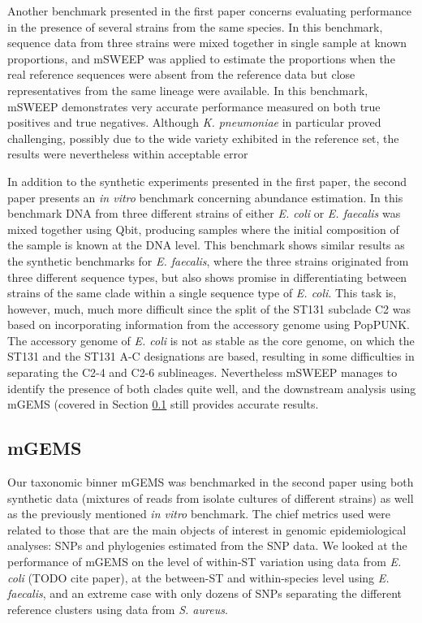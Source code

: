 \documentclass[officiallayout]{tktla}
\begin{document}
Another benchmark presented in the first paper concerns evaluating
performance in the presence of several strains from the same
species. In this benchmark, sequence data from three strains were
mixed together in single sample at known proportions, and mSWEEP was
applied to estimate the proportions when the real reference sequences
were absent from the reference data but close representatives from the
same lineage were available. In this benchmark, mSWEEP demonstrates
very accurate performance measured on both true positives and true
negatives. Although \textit{K. pneumoniae} in particular proved
challenging, possibly due to the wide variety exhibited in the
reference set, the results were nevertheless within acceptable error

In addition to the synthetic experiments presented in the first paper,
the second paper presents an \textit{in vitro} benchmark concerning
abundance estimation. In this benchmark DNA from three different
strains of either \textit{E. coli} or \textit{E. faecalis} was mixed
together using Qbit, producing samples where the initial composition
of the sample is known at the DNA level. This benchmark shows similar
results as the synthetic benchmarks for \textit{E. faecalis}, where
the three strains originated from three different sequence types, but
also shows promise in differentiating between strains of the same
clade within a single sequence type of \textit{E. coli}. This task is,
however, much, much more difficult since the split of the ST131
subclade C2 was based on incorporating information from the accessory
genome using PopPUNK. The accessory genome of \textit{E. coli} is not
as stable as the core genome, on which the ST131 and the ST131 A-C
designations are based, resulting in some difficulties in separating
the C2-4 and C2-6 sublineages. Nevertheless mSWEEP manages to identify
the presence of both clades quite well, and the downstream analysis
using mGEMS (covered in Section \ref{mgems-performance-benchmark}
still provides accurate results.

\subsection{mGEMS}
\label{mgems-performance-benchmark}

Our taxonomic binner mGEMS was benchmarked in the second paper using
both synthetic data (mixtures of reads from isolate cultures of
different strains) as well as the previously mentioned \textit{in
  vitro} benchmark. The chief metrics used were related to those that
are the main objects of interest in genomic epidemiological analyses:
SNPs and phylogenies estimated from the SNP data. We looked at the
performance of mGEMS on the level of within-ST variation using data
from \textit{E. coli} (TODO cite paper), at the between-ST and
within-species level using \textit{E. faecalis}, and an extreme case
with only dozens of SNPs separating the different reference clusters
using data from \textit{S. aureus}.
\end{document}
